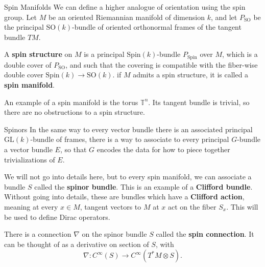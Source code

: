 \documentclass[11pt, reqno]{beamer}
\begin{document}
\begin{frame}{Spin Manifolds}
    We can define a higher analogue of orientation using the spin group. Let $M$ be an oriented Riemannian
    manifold of dimension $k$, and let $P_{\text{SO}}$ be the principal $\text{SO}(k)$-bundle 
    of oriented orthonormal frames of the tangent bundle $TM$. 
    \begin{definition}
        A \textbf{spin structure} on $M$ is a principal $\text{Spin}(k)$-bundle 
        $P_{\text{Spin}}$ over $M$, which is a double cover of $P_{\text{SO}}$,
        and such that the covering is compatible with the fiber-wise double cover $\text{Spin}(k) \to \text{SO}(k)$.
        if $M$ admits a spin structure, it is called a \textbf{spin manifold}.
    \end{definition}

    An example of a spin manifold is the torus $\mathbb{T}^n$. Its tangent bundle is trivial, so there
    are no obstructions to a spin structure.
\end{frame}

\begin{frame}{Spinors}
    In the same way to every vector bundle there is an associated principal $\text{GL}(k)$-bundle of frames,
    there is a way to associate to every principal $G$-bundle a vector bundle $E$, so that $G$ encodes the
    data for how to piece together trivializations of $E$.

    \medskip
    We will not go into details here, but to every spin manifold, we can associate a bundle $S$ called the 
    \textbf{spinor bundle}. This is an example of a \textbf{Clifford bundle}. Without going into details,
    these are bundles which have a \textbf{Clifford action}, meaning at every $x \in M$, tangent
    vectors to $M$ at $x$ act on the fiber $S_x$. This will be used to define Dirac operators. 

    \medskip
    There is a connection $\nabla$ on the spinor bundle $S$ called the \textbf{spin connection}. It
    can be thought of as a derivative on section of $S$, with
    \[
        \nabla: C^\infty(S) \to C^\infty(T^*M\otimes S).
    \]

\end{frame}
\end{document}
